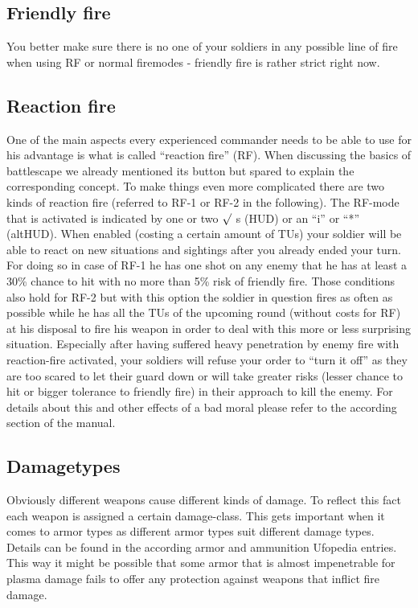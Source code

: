 \subsection{Friendly fire}
You better make sure there is no one of your soldiers in any possible line of fire when using RF or normal firemodes - friendly fire is rather strict right now.

\subsection{Reaction fire}
One of the main aspects every experienced commander needs to be able to use for his advantage is what is called ``reaction fire'' (RF). When discussing the basics of battlescape we already mentioned its button but spared to explain the corresponding concept. To make things even more complicated there are two kinds of reaction fire (referred to RF-1 or RF-2 in the following). The RF-mode that is activated is indicated by one or two $\surd$ s (HUD) or an ``i'' or ``*'' (altHUD). When enabled (costing a certain amount of TUs) your soldier will be able to react on new situations and sightings after you already ended your turn. For doing so in case of RF-1 he has one shot on any enemy that he has at least a 30\% chance to hit with no more than 5\% risk of friendly fire. Those conditions also hold for RF-2 but with this option the soldier in question fires as often as possible while he has all the TUs of the upcoming round (without costs for RF) at his disposal to fire his weapon in order to deal with this more or less surprising situation. Especially after having suffered heavy penetration by enemy fire with reaction-fire activated, your soldiers will refuse your order to ``turn it off'' as they are too scared to let their guard down or will take greater risks (lesser chance to hit or bigger tolerance to friendly fire) in their approach to kill the enemy. For details about this and other effects of a bad moral please refer to the according section of the manual.

\subsection{Damagetypes}
Obviously different weapons cause different kinds of damage. To reflect this fact each weapon is assigned a certain damage-class. This gets important when it comes to armor types as different armor types suit different damage types. Details can be found in the according armor and ammunition Ufopedia entries. This way it might be possible that some armor that is almost impenetrable for plasma damage fails to offer any protection against weapons that inflict fire damage.

